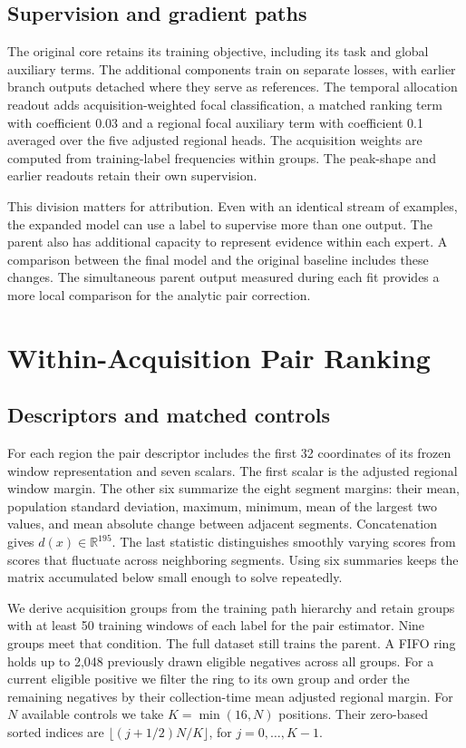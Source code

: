 \documentclass{article}
\begin{document}
\subsection{Supervision and gradient paths}
The original core retains its training objective, including its task and global auxiliary terms. The additional components train on separate losses, with earlier branch outputs detached where they serve as references. The temporal allocation readout adds acquisition-weighted focal classification, a matched ranking term with coefficient 0.03 and a regional focal auxiliary term with coefficient 0.1 averaged over the five adjusted regional heads. The acquisition weights are computed from training-label frequencies within groups. The peak-shape and earlier readouts retain their own supervision.

This division matters for attribution. Even with an identical stream of examples, the expanded model can use a label to supervise more than one output. The parent also has additional capacity to represent evidence within each expert. A comparison between the final model and the original baseline includes these changes. The simultaneous parent output measured during each fit provides a more local comparison for the analytic pair correction.

\section{Within-Acquisition Pair Ranking}
\subsection{Descriptors and matched controls}
For each region the pair descriptor includes the first 32 coordinates of its frozen window representation and seven scalars. The first scalar is the adjusted regional window margin. The other six summarize the eight segment margins: their mean, population standard deviation, maximum, minimum, mean of the largest two values, and mean absolute change between adjacent segments. Concatenation gives $d(x)\in\mathbb{R}^{195}$. The last statistic distinguishes smoothly varying scores from scores that fluctuate across neighboring segments. Using six summaries keeps the matrix accumulated below small enough to solve repeatedly.

We derive acquisition groups from the training path hierarchy and retain groups with at least 50 training windows of each label for the pair estimator. Nine groups meet that condition. The full dataset still trains the parent. A FIFO ring holds up to 2,048 previously drawn eligible negatives across all groups. For a current eligible positive we filter the ring to its own group and order the remaining negatives by their collection-time mean adjusted regional margin. For $N$ available controls we take $K=\min(16,N)$ positions. Their zero-based sorted indices are $\lfloor(j+1/2)N/K\rfloor$, for $j=0,\ldots,K-1$.
\end{document}
